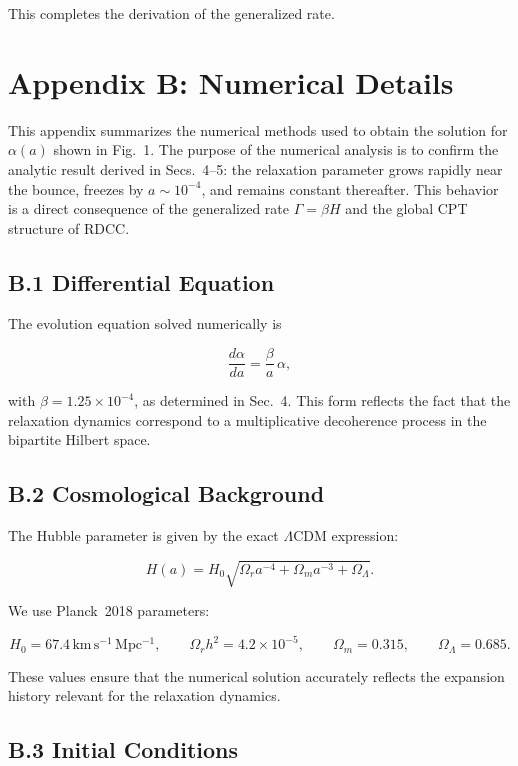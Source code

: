\documentclass[11pt,a4paper]{article}
\begin{document}
This completes the derivation of the generalized rate.

\section*{Appendix B: Numerical Details}

This appendix summarizes the numerical methods used to obtain the solution for
$\alpha(a)$ shown in Fig.~1. The purpose of the numerical analysis is to confirm the
analytic result derived in Secs.~4–5: the relaxation parameter grows rapidly near the
bounce, freezes by $a \sim 10^{-4}$, and remains constant thereafter. This behavior is a
direct consequence of the generalized rate $\Gamma = \beta H$ and the global CPT
structure of RDCC.

\subsection*{B.1 Differential Equation}

The evolution equation solved numerically is


\[
    \frac{d\alpha}{da}
    = \frac{\beta}{a}\,\alpha,
\]


with $\beta = 1.25 \times 10^{-4}$, as determined in Sec.~4. This form reflects the fact
that the relaxation dynamics correspond to a multiplicative decoherence process in the
bipartite Hilbert space.

\subsection*{B.2 Cosmological Background}

The Hubble parameter is given by the exact $\Lambda$CDM expression:


\[
    H(a)
    = H_0\sqrt{
        \Omega_r a^{-4}
        + \Omega_m a^{-3}
        + \Omega_\Lambda }.
\]



We use Planck~2018 parameters:


\[
    H_0 = 67.4\,\mathrm{km\,s^{-1}\,Mpc^{-1}}, \qquad
    \Omega_r h^2 = 4.2 \times 10^{-5}, \qquad
    \Omega_m = 0.315, \qquad
    \Omega_\Lambda = 0.685.
\]



These values ensure that the numerical solution accurately reflects the expansion
history relevant for the relaxation dynamics.

\subsection*{B.3 Initial Conditions}
\end{document}
